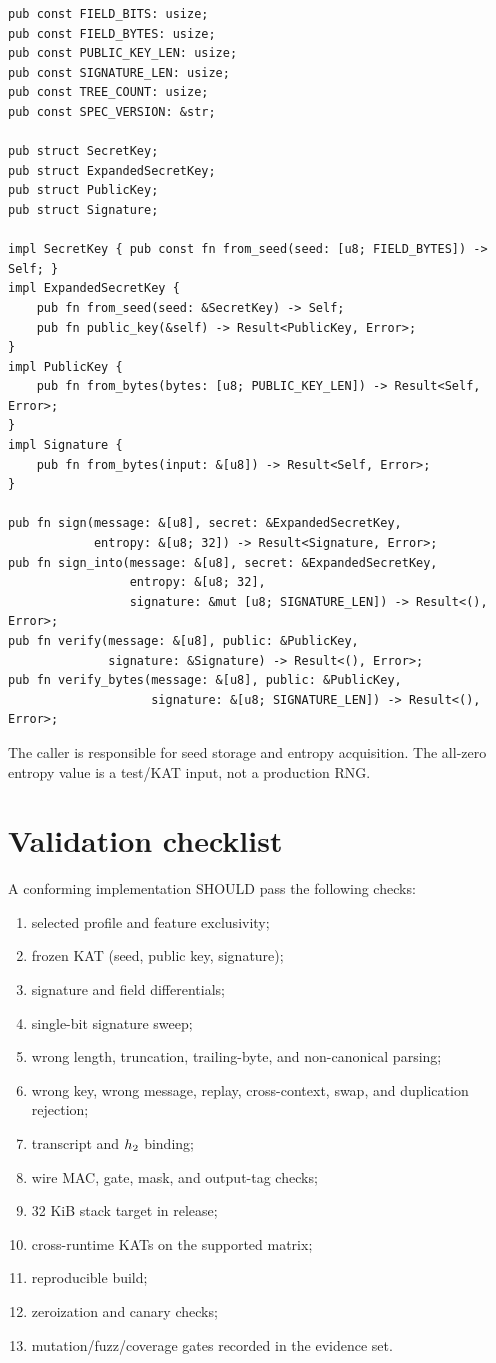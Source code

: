 \documentclass[11pt,a4paper]{article}
\begin{document}
\begin{lstlisting}
pub const FIELD_BITS: usize;
pub const FIELD_BYTES: usize;
pub const PUBLIC_KEY_LEN: usize;
pub const SIGNATURE_LEN: usize;
pub const TREE_COUNT: usize;
pub const SPEC_VERSION: &str;

pub struct SecretKey;
pub struct ExpandedSecretKey;
pub struct PublicKey;
pub struct Signature;

impl SecretKey { pub const fn from_seed(seed: [u8; FIELD_BYTES]) -> Self; }
impl ExpandedSecretKey {
    pub fn from_seed(seed: &SecretKey) -> Self;
    pub fn public_key(&self) -> Result<PublicKey, Error>;
}
impl PublicKey {
    pub fn from_bytes(bytes: [u8; PUBLIC_KEY_LEN]) -> Result<Self, Error>;
}
impl Signature {
    pub fn from_bytes(input: &[u8]) -> Result<Self, Error>;
}

pub fn sign(message: &[u8], secret: &ExpandedSecretKey,
            entropy: &[u8; 32]) -> Result<Signature, Error>;
pub fn sign_into(message: &[u8], secret: &ExpandedSecretKey,
                 entropy: &[u8; 32],
                 signature: &mut [u8; SIGNATURE_LEN]) -> Result<(), Error>;
pub fn verify(message: &[u8], public: &PublicKey,
              signature: &Signature) -> Result<(), Error>;
pub fn verify_bytes(message: &[u8], public: &PublicKey,
                    signature: &[u8; SIGNATURE_LEN]) -> Result<(), Error>;
\end{lstlisting}

The caller is responsible for seed storage and entropy acquisition. The
all-zero entropy value is a test/KAT input, not a production RNG.

\section{Validation checklist}

A conforming implementation SHOULD pass the following checks:

\begin{enumerate}
  \item selected profile and feature exclusivity;
  \item frozen KAT (seed, public key, signature);
  \item signature and field differentials;
  \item single-bit signature sweep;
  \item wrong length, truncation, trailing-byte, and non-canonical parsing;
  \item wrong key, wrong message, replay, cross-context, swap, and duplication
        rejection;
  \item transcript and $h_2$ binding;
  \item wire MAC, gate, mask, and output-tag checks;
  \item 32 KiB stack target in release;
  \item cross-runtime KATs on the supported matrix;
  \item reproducible build;
  \item zeroization and canary checks;
  \item mutation/fuzz/coverage gates recorded in the evidence set.
\end{enumerate}
\end{document}
